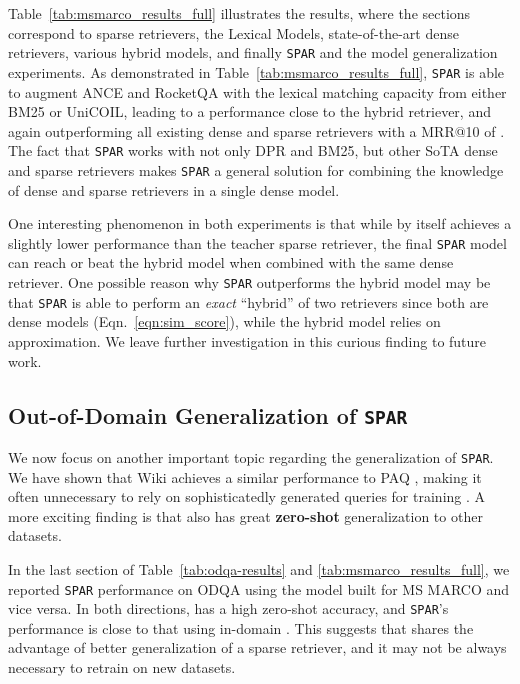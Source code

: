 \documentclass[11pt]{article}
\newcommand{\spar}{\texttt{SPAR}\xspace}
\newcommand{\lexmodel}{Lexical Model}
\newcommand{\lexmodelsymbol}{\xspace}
\begin{document}
Table~\ref{tab:msmarco_results_full} illustrates the results, where the sections correspond to sparse retrievers, the \lexmodel{}s, state-of-the-art dense retrievers, various hybrid models, and finally \spar{} and the model generalization experiments.
As demonstrated in Table~\ref{tab:msmarco_results_full}, \spar{} is able to augment ANCE and RocketQA with the lexical matching capacity from either BM25 or UniCOIL, leading to a performance close to the hybrid retriever, and again outperforming all existing dense and sparse retrievers with a MRR@10 of .
The fact that \spar{} works with not only DPR and BM25, but other SoTA dense and sparse retrievers makes \spar{} a general solution for combining the knowledge of dense and sparse retrievers in a single dense model.

One interesting phenomenon in both experiments is that while \lexmodelsymbol{} by itself achieves a slightly lower performance than the teacher sparse retriever, the final \spar{} model can reach or beat the hybrid model when combined with the same dense retriever.
One possible reason why \spar{} outperforms the hybrid model may be that \spar{} is able to perform an \emph{exact} ``hybrid'' of two retrievers since both are dense models (Eqn.~\ref{eqn:sim_score}), while the hybrid model relies on approximation.
We leave further investigation in this curious finding to future work.

\subsection{Out-of-Domain Generalization of \spar{}}\label{sec:discussion:generalization}

We now focus on another important topic regarding the generalization of \spar{}.
We have shown that Wiki \lexmodelsymbol{} achieves a similar performance to PAQ \lexmodelsymbol{}, making it often unnecessary to rely on sophisticatedly generated queries for training \lexmodelsymbol{}.
A more exciting finding is that \lexmodelsymbol{} also has great \textbf{zero-shot} generalization to other datasets.

In the last section of Table~\ref{tab:odqa-results} and \ref{tab:msmarco_results_full}, we reported \spar{} performance on ODQA using the \lexmodelsymbol{} model built for MS MARCO and vice versa.
In both directions, \lexmodelsymbol{} has a high zero-shot accuracy, and \spar{}'s performance is close to that using in-domain \lexmodelsymbol{}.
This suggests that \lexmodelsymbol{} shares the advantage of better generalization of a sparse retriever, and it may not be always necessary to retrain \lexmodelsymbol{} on new datasets.
\end{document}
